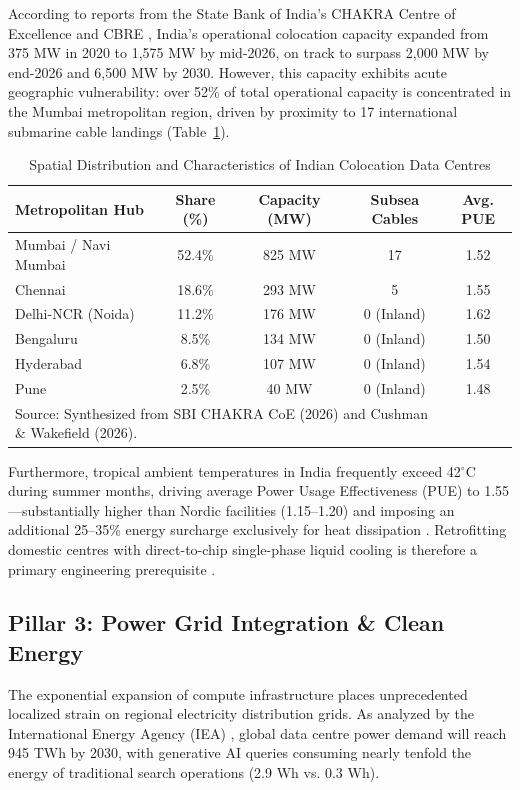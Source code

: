 \documentclass[conference,a4paper]{IEEEtran}
\begin{document}
According to reports from the State Bank of India's CHAKRA Centre of Excellence \cite{sbichakra2026} and CBRE \cite{cbre2026dc}, India's operational colocation capacity expanded from 375 MW in 2020 to 1,575 MW by mid-2026, on track to surpass 2,000 MW by end-2026 and 6,500 MW by 2030. However, this capacity exhibits acute geographic vulnerability: over 52\% of total operational capacity is concentrated in the Mumbai metropolitan region, driven by proximity to 17 international submarine cable landings (Table~\ref{tab:dc_metros}).

\begin{table}[htbp]
\caption{Spatial Distribution and Characteristics of Indian Colocation Data Centres}
\begin{center}
\begin{tabularx}{\columnwidth}{lcccc}
\toprule
\textbf{Metropolitan Hub} & \textbf{Share (\%)} & \textbf{Capacity (MW)} & \textbf{Subsea Cables} & \textbf{Avg. PUE} \\
\midrule
Mumbai / Navi Mumbai & 52.4\% & 825 MW & 17 & 1.52 \\
Chennai & 18.6\% & 293 MW & 5 & 1.55 \\
Delhi-NCR (Noida) & 11.2\% & 176 MW & 0 (Inland) & 1.62 \\
Bengaluru & 8.5\% & 134 MW & 0 (Inland) & 1.50 \\
Hyderabad & 6.8\% & 107 MW & 0 (Inland) & 1.54 \\
Pune & 2.5\% & 40 MW & 0 (Inland) & 1.48 \\
\bottomrule
\multicolumn{4}{l}{\footnotesize Source: Synthesized from SBI CHAKRA CoE (2026) and Cushman \& Wakefield (2026).}
\end{tabularx}
\label{tab:dc_metros}
\end{center}
\end{table}

Furthermore, tropical ambient temperatures in India frequently exceed 42$^\circ$C during summer months, driving average Power Usage Effectiveness (PUE) to 1.55—substantially higher than Nordic facilities (1.15–1.20) and imposing an additional 25–35\% energy surcharge exclusively for heat dissipation \cite{sbichakra2026}. Retrofitting domestic centres with direct-to-chip single-phase liquid cooling is therefore a primary engineering prerequisite \cite{ieee_tcpmt2026cooling}.

\subsection{Pillar 3: Power Grid Integration \& Clean Energy}
The exponential expansion of compute infrastructure places unprecedented localized strain on regional electricity distribution grids. As analyzed by the International Energy Agency (IEA) \cite{iea2024energy}, global data centre power demand will reach 945 TWh by 2030, with generative AI queries consuming nearly tenfold the energy of traditional search operations (2.9 Wh vs. 0.3 Wh).
\end{document}
